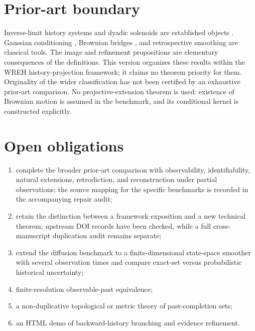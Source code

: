 \documentclass[11pt]{article}
\begin{document}
\section{Prior-art boundary}
Inverse-limit history systems and dyadic solenoids are established
objects \cite[Section 1]{ClarkFokkink2004}. Gaussian conditioning
\cite[Appendix A.1]{SarkkaSvensson2023}, Brownian bridges
\cite{Pitman2003}, and retrospective smoothing
\cite{RauchTungStriebel1965} are classical tools.
The image and refinement propositions are elementary consequences
of the definitions. This version organizes these results within
the WREH history-projection framework; it claims no theorem priority
for them. Originality of the wider classification has not been
certified by an exhaustive prior-art comparison.
No projective-extension theorem is used: existence of Brownian motion
is assumed in the benchmark, and its conditional kernel is constructed
explicitly.

\section{Open obligations}
\begin{enumerate}
\item complete the broader prior-art comparison with observability,
identifiability, natural extensions, retrodiction, and reconstruction
under partial observations; the source mapping for the specific
benchmarks is recorded in the accompanying repair audit;
\item retain the distinction between a framework exposition and a new
technical theorem; upstream DOI records have been checked, while a full
cross-manuscript duplication audit remains separate;
\item extend the diffusion benchmark to a finite-dimensional state-space smoother with several observation times and compare exact-set versus probabilistic historical uncertainty;
\item finite-resolution observable-past equivalence;
\item a non-duplicative topological or metric theory of past-completion sets;
\item an HTML demo of backward-history branching and evidence refinement.
\end{enumerate}
\end{document}
